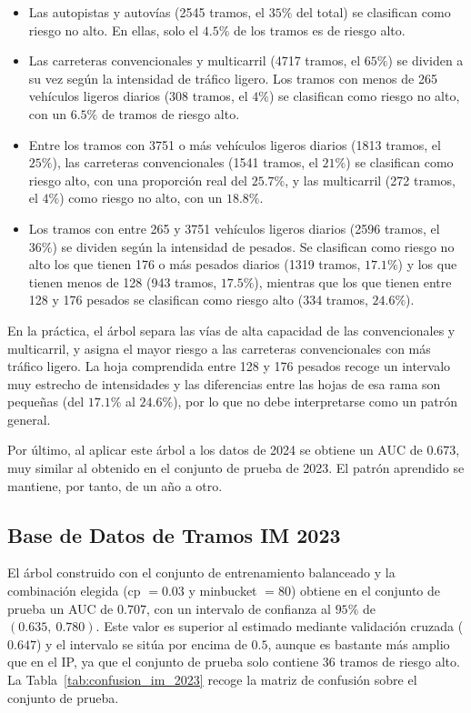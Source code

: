 \documentclass[twoside,a4paper,12pt,onecolumn,openany]{book}
\begin{document}
\begin{itemize}
    \item Las autopistas y autovías (2545 tramos, el $35\%$ del total) se clasifican como riesgo no alto. En ellas, solo el $4.5\%$ de los tramos es de riesgo alto.
    \item Las carreteras convencionales y multicarril (4717 tramos, el $65\%$) se dividen a su vez según la intensidad de tráfico ligero. Los tramos con menos de 265 vehículos ligeros diarios (308 tramos, el $4\%$) se clasifican como riesgo no alto, con un $6.5\%$ de tramos de riesgo alto.
    \item Entre los tramos con 3751 o más vehículos ligeros diarios (1813 tramos, el $25\%$), las carreteras convencionales (1541 tramos, el $21\%$) se clasifican como riesgo alto, con una proporción real del $25.7\%$, y las multicarril (272 tramos, el $4\%$) como riesgo no alto, con un $18.8\%$.
    \item Los tramos con entre 265 y 3751 vehículos ligeros diarios (2596 tramos, el $36\%$) se dividen según la intensidad de pesados. Se clasifican como riesgo no alto los que tienen 176 o más pesados diarios (1319 tramos, $17.1\%$) y los que tienen menos de 128 (943 tramos, $17.5\%$), mientras que los que tienen entre 128 y 176 pesados se clasifican como riesgo alto (334 tramos, $24.6\%$).
\end{itemize}
 
En la práctica, el árbol separa las vías de alta capacidad de las convencionales y multicarril, y asigna el mayor riesgo a las carreteras convencionales con más tráfico ligero. La hoja comprendida entre 128 y 176 pesados recoge un intervalo muy estrecho de intensidades y las diferencias entre las hojas de esa rama son pequeñas (del $17.1\%$ al $24.6\%$), por lo que no debe interpretarse como un patrón general.
 
\vspace{0.5cm}
 
Por último, al aplicar este árbol a los datos de 2024 se obtiene un AUC de $0.673$, muy similar al obtenido en el conjunto de prueba de 2023. El patrón aprendido se mantiene, por tanto, de un año a otro.
 
\subsection{Base de Datos de Tramos IM 2023}
 
El árbol construido con el conjunto de entrenamiento balanceado y la combinación elegida (cp $=0.03$ y minbucket $=80$) obtiene en el conjunto de prueba un AUC de $0.707$, con un intervalo de confianza al $95\%$ de $(0.635,\ 0.780)$. Este valor es superior al estimado mediante validación cruzada ($0.647$) y el intervalo se sitúa por encima de $0.5$, aunque es bastante más amplio que en el IP, ya que el conjunto de prueba solo contiene 36 tramos de riesgo alto. La Tabla~\ref{tab:confusion_im_2023} recoge la matriz de confusión sobre el conjunto de prueba.
 
\end{document}
